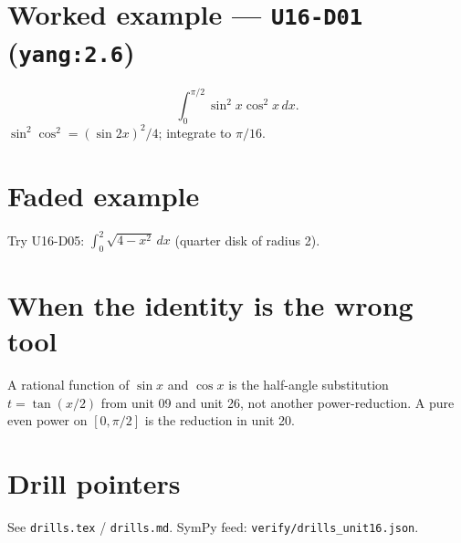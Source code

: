 \section{Worked example --- \texttt{U16-D01} (\texttt{yang:2.6})}
\[
\int_{0}^{\pi/2}\sin^{2}x\cos^{2}x\,dx.
\]
$\sin^{2}\cos^{2}=(\sin 2x)^{2}/4$; integrate to $\pi/16$.

\section{Faded example}
Try U16-D05: $\int_{0}^{2}\sqrt{4-x^{2}}\,dx$ (quarter disk of radius 2).

\section{When the identity is the wrong tool}
A rational function of $\sin x$ and $\cos x$ is the half-angle substitution $t=\tan(x/2)$ from unit 09 and unit 26, not another power-reduction. A pure even power on $[0,\pi/2]$ is the reduction in unit 20.

\section{Drill pointers}
See \texttt{drills.tex} / \texttt{drills.md}. SymPy feed: \texttt{verify/drills\_unit16.json}.


